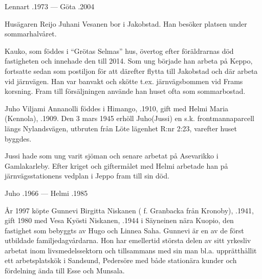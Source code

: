 Lennart .1973  ---  Göta .2004


%



%
Husägaren Reijo Juhani Vesanen bor i Jakobstad. Han besöker platsen under sommarhalvåret.\jhvspace{}


%
Kauko, som föddes i ``Grötas Selmas'' hus, övertog efter föräldrarnas död fastigheten och innehade den till 2014. Som ung började han arbeta på Keppo, fortsatte sedan som postiljon för att därefter flytta till Jakobstad och där arbeta vid järnvägen. Han var banvakt och skötte t.ex. järnvägsbommen vid Frams korsning. Fram till försäljningen använde han huset ofta som sommarbostad.


%
Juho Viljami Annanolli föddes i Himango, .1910, gift med Helmi Maria (Kennola), .1909. Den 3 mars 1945 erhöll Juho(Jussi) en s.k. frontmannaparcell längs Nylandsvägen, utbruten från Löte lägenhet R:nr 2:23, varefter huset byggdes.

Jussi hade som ung varit sjöman och senare arbetat på Asevarikko i Gamlakarleby. Efter kriget och giftermålet med Helmi arbetade han på järnvägsstationens vedplan i Jeppo fram till sin död.
\begin{jhchildren}
  \item {}
  \item {}
\end{jhchildren}

Juho .1966  ---  Helmi .1985



%



%
År 1997 köpte Gunnevi Birgitta Niskanen ( f. Granbacka från Kronoby), .1941, gift 1980 med Vesa Kyösti Niskanen, .1944 i Säyneinen nära Kuopio, den fastighet som bebyggts av Hugo och Linnea Saha. Gunnevi är en av de först utbildade familjedagvårdarna. Hon har emellertid största delen av sitt yrkesliv arbetat inom livsmedelssektorn och tillsammans med sin man bl.a. upprätthållit ett arbetsplatskök i Sandsund, Pedersöre med både stationära kunder och fördelning ända till Esse och Munsala.

